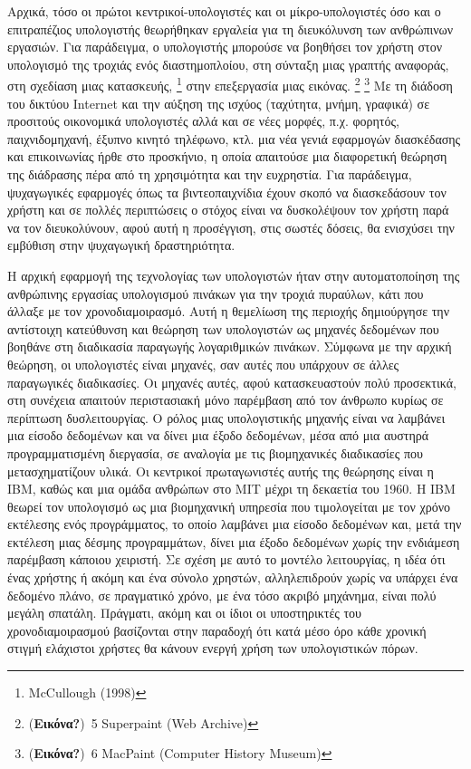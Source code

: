 \documentclass[
]{article}
\begin{document}
Αρχικά, τόσο οι πρώτοι κεντρικοί-υπολογιστές και οι μίκρο-υπολογιστές
όσο και ο επιτραπέζιος υπολογιστής θεωρήθηκαν εργαλεία για τη
διευκόλυνση των ανθρώπινων εργασιών. Για παράδειγμα, ο υπολογιστής
μπορούσε να βοηθήσει τον χρήστη στον υπολογισμό της τροχιάς ενός
διαστημοπλοίου, στη σύνταξη μιας γραπτής αναφοράς, στη σχεδίαση μιας
κατασκευής, \footnote{McCullough (1998)} στην επεξεργασία μιας εικόνας.
\footnote{(\textbf{Εικόνα?})~5 Superpaint (Web Archive)} \footnote{(\textbf{Εικόνα?})~6
  MacPaint (Computer History Museum)} Με τη διάδοση του δικτύου Internet
και την αύξηση της ισχύος (ταχύτητα, μνήμη, γραφικά) σε προσιτούς
οικονομικά υπολογιστές αλλά και σε νέες μορφές, π.χ. φορητός,
παιχνιδομηχανή, έξυπνο κινητό τηλέφωνο, κτλ. μια νέα γενιά εφαρμογών
διασκέδασης και επικοινωνίας ήρθε στο προσκήνιο, η οποία απαιτούσε μια
διαφορετική θεώρηση της διάδρασης πέρα από τη χρησιμότητα και την
ευχρηστία. Για παράδειγμα, ψυχαγωγικές εφαρμογές όπως τα βιντεοπαιχνίδια
έχουν σκοπό να διασκεδάσουν τον χρήστη και σε πολλές περιπτώσεις ο
στόχος είναι να δυσκολέψουν τον χρήστη παρά να τον διευκολύνουν, αφού
αυτή η προσέγγιση, στις σωστές δόσεις, θα ενισχύσει την εμβύθιση στην
ψυχαγωγική δραστηριότητα.

Η αρχική εφαρμογή της τεχνολογίας των υπολογιστών ήταν στην
αυτοματοποίηση της ανθρώπινης εργασίας υπολογισμού πινάκων για την
τροχιά πυραύλων, κάτι που άλλαξε με τον χρονοδιαμοιρασμό. Αυτή η
θεμελίωση της περιοχής δημιούργησε την αντίστοιχη κατεύθυνση και θεώρηση
των υπολογιστών ως μηχανές δεδομένων που βοηθάνε στη διαδικασία
παραγωγής λογαριθμικών πινάκων. Σύμφωνα με την αρχική θεώρηση, οι
υπολογιστές είναι μηχανές, σαν αυτές που υπάρχουν σε άλλες παραγωγικές
διαδικασίες. Οι μηχανές αυτές, αφού κατασκευαστούν πολύ προσεκτικά, στη
συνέχεια απαιτούν περιστασιακή μόνο παρέμβαση από τον άνθρωπο κυρίως σε
περίπτωση δυσλειτουργίας. Ο ρόλος μιας υπολογιστικής μηχανής είναι να
λαμβάνει μια είσοδο δεδομένων και να δίνει μια έξοδο δεδομένων, μέσα από
μια αυστηρά προγραμματισμένη διεργασία, σε αναλογία με τις βιομηχανικές
διαδικασίες που μετασχηματίζουν υλικά. Οι κεντρικοί πρωταγωνιστές αυτής
της θεώρησης είναι η IBM, καθώς και μια ομάδα ανθρώπων στο MIT μέχρι τη
δεκαετία του 1960. Η IBM θεωρεί τον υπολογισμό ως μια βιομηχανική
υπηρεσία που τιμολογείται με τον χρόνο εκτέλεσης ενός προγράμματος, το
οποίο λαμβάνει μια είσοδο δεδομένων και, μετά την εκτέλεση μιας δέσμης
προγραμμάτων, δίνει μια έξοδο δεδομένων χωρίς την ενδιάμεση παρέμβαση
κάποιου χειριστή. Σε σχέση με αυτό το μοντέλο λειτουργίας, η ιδέα ότι
ένας χρήστης ή ακόμη και ένα σύνολο χρηστών, αλληλεπιδρούν χωρίς να
υπάρχει ένα δεδομένο πλάνο, σε πραγματικό χρόνο, με ένα τόσο ακριβό
μηχάνημα, είναι πολύ μεγάλη σπατάλη. Πράγματι, ακόμη και οι ίδιοι οι
υποστηρικτές του χρονοδιαμοιρασμού βασίζονται στην παραδοχή ότι κατά
μέσο όρο κάθε χρονική στιγμή ελάχιστοι χρήστες θα κάνουν ενεργή χρήση
των υπολογιστικών πόρων.
\end{document}
